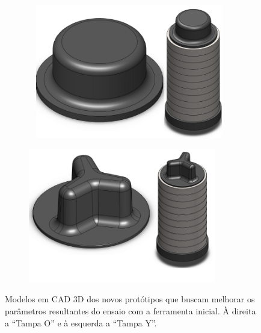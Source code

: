 \begin{figure}[htb]
    \centering
    \begin{subfigure}{.5\textwidth}\
        \centering
        \includegraphics[width = 0.9\textwidth]{Figures/Cap3/Tampa_O.png}
        \caption{}  
    \end{subfigure}%
    \begin{subfigure}{.5\textwidth}
        \centering
        \includegraphics[width = 0.9\textwidth]{Figures/Cap3/Tampa_Y.png}
        \caption{}
    \end{subfigure}
    \caption[Modelos CAD dos novos protótipos de tampa]%
    {Modelos em CAD 3D dos novos protótipos que buscam melhorar os parâmetros resultantes do ensaio com a ferramenta inicial. À direita a “Tampa O” e à esquerda a “Tampa Y”.}
    \label{fig:novos_prototipos}
\end{figure}
\newpage
